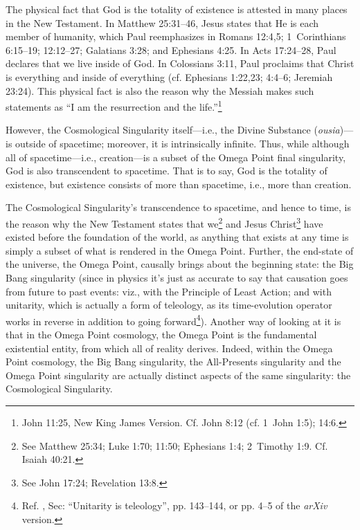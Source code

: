 \documentclass[letterpaper,12pt]{article}
\begin{document}
The physical fact that God is the totality of existence is attested in many places in the New Testament. In Matthew 25:31--46, Jesus states that He is each member of humanity, which Paul reemphasizes in Romans 12:4,5; 1~Corinthians 6:15--19; 12:12--27; Galatians 3:28; and Ephesians 4:25. In Acts 17:24--28, Paul declares that we live inside of God. In Colossians 3:11, Paul proclaims that Christ is everything and inside of everything (cf. Ephesians 1:22,23; 4:4--6; Jeremiah 23:24). This physical fact is also the reason why the Messiah makes such statements as ``I am the resurrection and the life.''\footnote{John 11:25, New King James Version. Cf. John 8:12 (cf. 1~John 1:5); 14:6.}

However, the Cosmological Singularity itself---i.e., the Divine Substance (\emph{ousia})---is outside of spacetime; moreover, it is intrinsically infinite. Thus, while although all of spacetime---i.e., creation---is a subset of the Omega Point final singularity, God is also transcendent to spacetime. That is to say, God is the totality of existence, but existence consists of more than spacetime, i.e., more than creation.

The Cosmological Singularity's transcendence to spacetime, and hence to time, is the reason why the New Testament states that we\footnote{See Matthew 25:34; Luke 1:70; 11:50; Ephesians 1:4; 2~Timothy 1:9. Cf. Isaiah 40:21.} and Jesus Christ\footnote{See John 17:24; Revelation 13:8.} have existed before the foundation of the world, as anything that exists at any time is simply a subset of what is rendered in the Omega Point. Further, the end-state of the universe, the Omega Point, causally brings about the beginning state: the Big Bang singularity (since in physics it's just as accurate to say that causation goes from future to past events: viz., with the Principle of Least Action; and with \gls{unitarity}, which is actually a form of teleology, as its time-evolution operator works in reverse in addition to going forward\footnote{Ref. , Sec: ``Unitarity is teleology'', pp. 143--144, or pp. 4--5 of the \emph{arXiv} version.}). Another way of looking at it is that in the Omega Point cosmology, the Omega Point is the fundamental existential entity, from which all of reality derives. Indeed, within the Omega Point cosmology, the Big Bang singularity, the All-Presents singularity and the Omega Point singularity are actually distinct aspects of the same singularity: the Cosmological Singularity.
\end{document}
